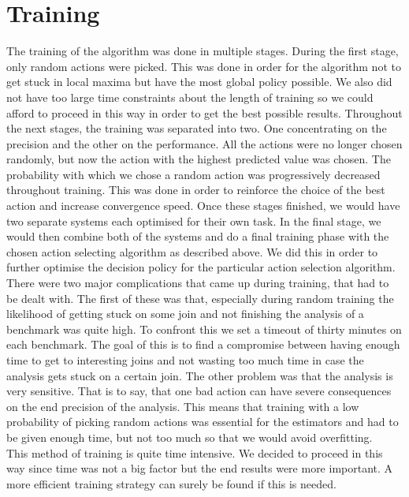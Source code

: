 \section{Training}

The training of the algorithm was done in multiple stages. During the first stage, only random actions were picked. This was done in order for the algorithm not to get stuck in local maxima but have the most global policy possible. We also did not have too large time constraints about the length of training so we could afford to proceed in this way in order to get the best possible results. Throughout the next stages, the training was separated into two. One concentrating on the precision and the other on the performance. All the actions were no longer chosen randomly, but now the action with the highest predicted value was chosen. The probability with which we chose a random action was progressively decreased throughout training. This was done in order to reinforce the choice of the best action and increase convergence speed. Once these stages finished, we would have two separate systems each optimised for their own task. In the final stage, we would then combine both of the systems and do a final training phase with the chosen action selecting algorithm as described above. We did this in order to further optimise the decision policy for the particular action selection algorithm.\\
There were two major complications that came up during training, that had to be dealt with. The first of these was that, especially during random training the likelihood of getting stuck on some join and not finishing the analysis of a benchmark was quite high. To confront this we set a timeout of thirty minutes on each benchmark. The goal of this is to find a compromise between having enough time to get to interesting joins and not wasting too much time in case the analysis gets stuck on a certain join. The other problem was that the analysis is very sensitive. That is to say, that one bad action can have severe consequences on the end precision of the analysis. This means that training with a low probability of picking random actions was essential for the estimators and had to be given enough time, but not too much so that we would avoid overfitting.\\
This method of training is quite time intensive. We decided to proceed in this way since time was not a big factor but the end results were more important. A more efficient training strategy can surely be found if this is needed.




















